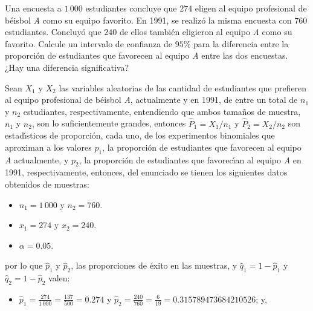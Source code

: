 \begin{enunciado}
 Una encuesta a $1\,000$ estudiantes concluye que $274$ eligen al equipo profesional de b\'eisbol \textit{A} como su equipo favorito. En 1991, se realiz\'o la misma encuesta con $760$ estudiantes. Concluy\'o que $240$ de ellos tambi\'en eligieron al equipo \textit{A} como su favorito. Calcule un intervalo de confianza de $95\%$ para la diferencia entre la proporci\'on de estudiantes que favorecen al equipo \textit{A} entre las dos encuestas. ¿Hay una diferencia significativa?
\end{enunciado}

\begin{solucion}
 Sean $X_1$ y $X_2$ las variables aleatorias de las cantidad de estudiantes que prefieren al equipo profesional de b\'eisbol \textit{A}, actualmente y en 1991, de entre un total de $n_1$ y $n_2$ estudiantes, respectivamente, entendiendo que ambos tama\~nos de muestra, $n_1$ y $n_2$, son lo suficientemente grandes, entonces $\widehat{P}_1 = X_1/n_1$ y $\widehat{P}_2 = X_2/n_2$ son estad\'{\i}sticos de proporci\'on, cada uno, de los experimentos binomiales que aproximan a los valores $p_1$, la proporci\'on de estudiantes que favorecen al equipo \textit{A} actualmente, y $p_2$, la proporci\'on de estudiantes que favorec\'{\i}an al equipo \textit{A} en 1991, respectivamente, entonces, del enunciado se tienen los siguientes datos obtenidos de muestras:
 \begin{itemize}
  \item $n_1 = 1\,000$ y $n_2 = 760$.
  \item $x_1 = 274$ y $x_2 = 240$.
  \item $\alpha = 0.05$.
 \end{itemize}
 por lo que $\hat{p}_1$ y $\hat{p}_2$, las proporciones de \'exito en las muestras, y $\hat{q}_1 = 1 - \hat{p}_1$ y $\hat{q}_2 = 1 - \hat{p}_2$ valen:
 \begin{itemize}
  \item $\hat{p}_1 = \frac{274}{1\,000} = \frac{137}{500} = 0.274$ y $\hat{p}_2 = \frac{240}{760} = \frac{6}{19} = 0.\overline{315789473684210526}$; y,


\end{itemize}
\end{solucion}
